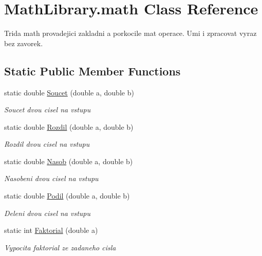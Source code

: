 \hypertarget{class_math_library_1_1math}{}\section{Math\+Library.\+math Class Reference}
\label{class_math_library_1_1math}


Trida math provadejici zakladni a porkocile mat operace. Umi i zpracovat vyraz bez zavorek.  


\subsection*{Static Public Member Functions}
\begin{DoxyCompactItemize}
\item 
static double \mbox{\hyperlink{class_math_library_1_1math_ad33392c83756895b4a5af417ed69270d}{Soucet}} (double a, double b)
\begin{DoxyCompactList}\small\item\em Soucet dvou cisel na vstupu \end{DoxyCompactList}\item 
static double \mbox{\hyperlink{class_math_library_1_1math_a888226aaba3ab5f4ef310bbcfb0f9cd7}{Rozdil}} (double a, double b)
\begin{DoxyCompactList}\small\item\em Rozdil dvou cisel na vstupu \end{DoxyCompactList}\item 
static double \mbox{\hyperlink{class_math_library_1_1math_a39f0ce528d77e03cf63a00333f5973e6}{Nasob}} (double a, double b)
\begin{DoxyCompactList}\small\item\em Nasobeni dvou cisel na vstupu \end{DoxyCompactList}\item 
static double \mbox{\hyperlink{class_math_library_1_1math_a4cd9b49df0b6f0073c95c95b3f0e6e2f}{Podil}} (double a, double b)
\begin{DoxyCompactList}\small\item\em Deleni dvou cisel na vstupu \end{DoxyCompactList}\item 
static int \mbox{\hyperlink{class_math_library_1_1math_af838c111bbe0f378bb2ccfb3591cce3a}{Faktorial}} (double a)
\begin{DoxyCompactList}\small\item\em Vypocita faktorial ze zadaneho cisla \end{DoxyCompactList}\item 

\end{DoxyCompactItemize}
